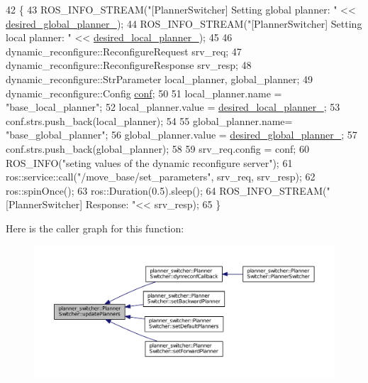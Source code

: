 \begin{DoxyCode}
42 \{
43   ROS\_INFO\_STREAM(\textcolor{stringliteral}{"[PlannerSwitcher] Setting global planner: "} << 
      \hyperlink{classplanner__switcher_1_1PlannerSwitcher_a5366081108ad08665549439b00902c58}{desired\_global\_planner\_});
44   ROS\_INFO\_STREAM(\textcolor{stringliteral}{"[PlannerSwitcher] Setting local planner: "} << 
      \hyperlink{classplanner__switcher_1_1PlannerSwitcher_a112b2460ae1846c796d66d77288b6104}{desired\_local\_planner\_});
45 
46   dynamic\_reconfigure::ReconfigureRequest srv\_req;
47   dynamic\_reconfigure::ReconfigureResponse srv\_resp;
48   dynamic\_reconfigure::StrParameter local\_planner, global\_planner;
49   dynamic\_reconfigure::Config \hyperlink{namespaceconf}{conf};
50 
51   local\_planner.name = \textcolor{stringliteral}{"base\_local\_planner"};
52   local\_planner.value =  \hyperlink{classplanner__switcher_1_1PlannerSwitcher_a112b2460ae1846c796d66d77288b6104}{desired\_local\_planner\_};
53   conf.strs.push\_back(local\_planner);
54 
55   global\_planner.name= \textcolor{stringliteral}{"base\_global\_planner"};
56   global\_planner.value = \hyperlink{classplanner__switcher_1_1PlannerSwitcher_a5366081108ad08665549439b00902c58}{desired\_global\_planner\_};
57   conf.strs.push\_back(global\_planner);
58   
59   srv\_req.config = conf;
60   ROS\_INFO(\textcolor{stringliteral}{"seting values of the dynamic reconfigure server"});
61   ros::service::call(\textcolor{stringliteral}{"/move\_base/set\_parameters"}, srv\_req, srv\_resp);
62   ros::spinOnce();
63   ros::Duration(0.5).sleep();
64   ROS\_INFO\_STREAM(\textcolor{stringliteral}{"[PlannerSwitcher] Response: "}<< srv\_resp);
65 \}
\end{DoxyCode}


Here is the caller graph for this function\+:
\nopagebreak
\begin{figure}[H]
\begin{center}
\leavevmode
\includegraphics[width=350pt]{classplanner__switcher_1_1PlannerSwitcher_a6832bfbe3acdb77705c83e2f1ec467d2_icgraph}
\end{center}
\end{figure}




